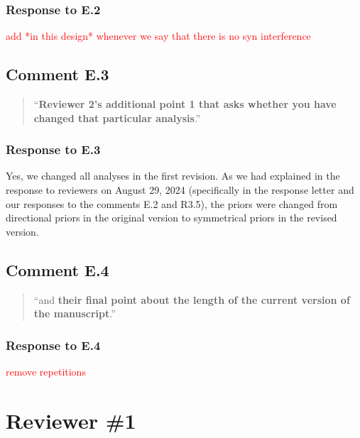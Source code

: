 \documentclass[12pt]{article}
\begin{document}
\subsubsection*{Response to E.2}
\textcolor{red}{add *in this design* whenever we say that there is no syn interference}

\subsection*{Comment E.3}
\begin{quote}
``\textbf{Reviewer 2's additional point 1 that asks whether you have changed that particular analysis}.''
\end{quote}

\subsubsection*{Response to E.3}
Yes, we changed all analyses in the first revision. As we had explained in the response to reviewers on August 29, 2024 (specifically in the response letter and our responses to the comments E.2 and R3.5), the priors were changed from directional priors in the original version to symmetrical priors in the revised version.

\subsection*{Comment E.4}
\begin{quote}
``and \textbf{their final point about the length of the current version of the manuscript}.''
\end{quote}

\subsubsection*{Response to E.4}
\textcolor{red}{remove repetitions}

\section*{Reviewer \#1} 
\end{document}

